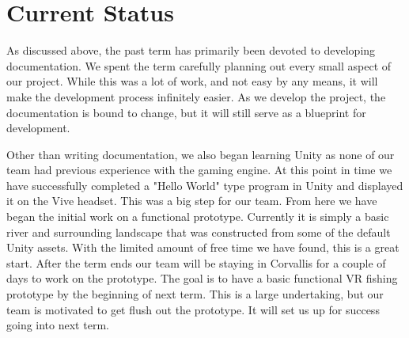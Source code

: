 \documentclass[10pt,journal,compsoc,onecolumn, draftclsnofoot]{IEEEtran}
\begin{document}
\section{Current Status}
As discussed above, the past term has primarily been devoted to developing documentation.
We spent the term carefully planning out every small aspect of our project.
While this was a lot of work, and not easy by any means, it will make the development process infinitely easier.
As we develop the project, the documentation is bound to change, but it will still serve as a blueprint for development.

Other than writing documentation, we also began learning Unity as none of our team had previous experience with the gaming engine.
At this point in time we have successfully completed a "Hello World" type program in Unity and displayed it on the Vive headset.
This was a big step for our team.
From here we have began the initial work on a functional prototype.
Currently it is simply a basic river and surrounding landscape that was constructed from some of the default Unity assets.
With the limited amount of free time we have found, this is a great start.
After the term ends our team will be staying in Corvallis for a couple of days to work on the prototype.
The goal is to have a basic functional VR fishing prototype by the beginning of next term.
This is a large undertaking, but our team is motivated to get flush out the prototype.
It will set us up for success going into next term.

%
%
\end{document}
